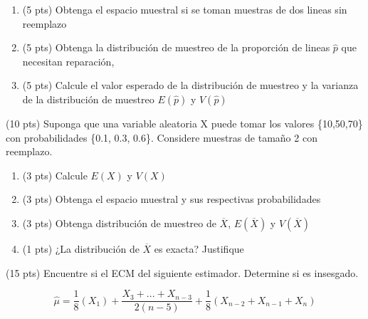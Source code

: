 \documentclass[addpoints]{exam}
\theoremstyle{mytheor}
\begin{document}
\begin{questions}
  \begin{enumerate}
  \item (5 pts) Obtenga el espacio muestral si se toman muestras de dos lineas sin reemplazo
  \item (5 pts) Obtenga la distribución de muestreo de la proporción de lineas $\hat{p}$ que necesitan reparación, 
  \item (5 pts) Calcule el valor esperado de la distribución de muestreo y la varianza de la distribución de muestreo $E(\hat{p})$ y $V(\hat{p})$
  \end{enumerate}
  
  
  \question (10 pts) Suponga que una variable aleatoria X puede tomar los valores \{10,50,70\} con probabilidades \{0.1, 0.3, 0.6\}. Considere muestras de tamaño 2 con reemplazo.
  
  \begin{enumerate}
  \item (3 pts) Calcule $E(X)$ y $V(X)$
  \item (3 pts) Obtenga el espacio muestral y sus respectivas probabilidades
  \item (3 pts) Obtenga distribución de muestreo de $\overline{X}$, $E(\overline{X})$ y $V(\overline{X})$
  \item (1 pts) ¿La distribución de $\overline{X}$ es exacta? Justifique
  \end{enumerate}

 \question (15 pts) Encuentre si el ECM del siguiente estimador. Determine si es insesgado. 
   
$$\hat{\mu} = \frac{1}{8} (X_1) + \frac{X_3+...+X_{n-3}}{2(n-5)} + \frac{1}{8} (X_{n-2}+X_{n-1}+X_{n}) $$


\end{questions}
\end{document}
